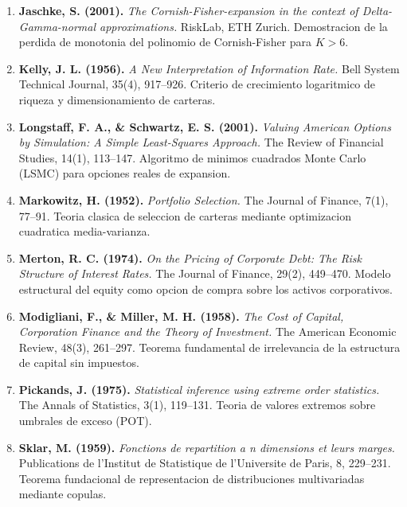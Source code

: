 \documentclass[10pt,a4paper]{article}
\theoremstyle{definition}
\begin{document}
\begin{enumerate}
    \item \textbf{Jaschke, S. (2001).} \textit{The Cornish-Fisher-expansion in the context of Delta-Gamma-normal approximations.} RiskLab, ETH Zurich. Demostracion de la perdida de monotonia del polinomio de Cornish-Fisher para $K > 6$.
    \item \textbf{Kelly, J. L. (1956).} \textit{A New Interpretation of Information Rate.} Bell System Technical Journal, 35(4), 917--926. Criterio de crecimiento logaritmico de riqueza y dimensionamiento de carteras.
    \item \textbf{Longstaff, F. A., \& Schwartz, E. S. (2001).} \textit{Valuing American Options by Simulation: A Simple Least-Squares Approach.} The Review of Financial Studies, 14(1), 113--147. Algoritmo de minimos cuadrados Monte Carlo (LSMC) para opciones reales de expansion.
    \item \textbf{Markowitz, H. (1952).} \textit{Portfolio Selection.} The Journal of Finance, 7(1), 77--91. Teoria clasica de seleccion de carteras mediante optimizacion cuadratica media-varianza.
    \item \textbf{Merton, R. C. (1974).} \textit{On the Pricing of Corporate Debt: The Risk Structure of Interest Rates.} The Journal of Finance, 29(2), 449--470. Modelo estructural del equity como opcion de compra sobre los activos corporativos.
    \item \textbf{Modigliani, F., \& Miller, M. H. (1958).} \textit{The Cost of Capital, Corporation Finance and the Theory of Investment.} The American Economic Review, 48(3), 261--297. Teorema fundamental de irrelevancia de la estructura de capital sin impuestos.
    \item \textbf{Pickands, J. (1975).} \textit{Statistical inference using extreme order statistics.} The Annals of Statistics, 3(1), 119--131. Teoria de valores extremos sobre umbrales de exceso (POT).
    \item \textbf{Sklar, M. (1959).} \textit{Fonctions de repartition a n dimensions et leurs marges.} Publications de l'Institut de Statistique de l'Universite de Paris, 8, 229--231. Teorema fundacional de representacion de distribuciones multivariadas mediante copulas.
\end{enumerate}
\end{document}
